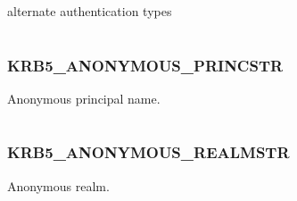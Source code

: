 \documentclass[letterpaper,10pt,english]{sphinxmanual}
\begin{document}
alternate authentication types

\begin{tabulary}{\linewidth}{|L|L|}
\hline

 & 
\\
\hline\end{tabulary}



\subsubsection{KRB5\_ANONYMOUS\_PRINCSTR}
\label{appdev/refs/macros/KRB5_ANONYMOUS_PRINCSTR:krb5-anonymous-princstr}\label{appdev/refs/macros/KRB5_ANONYMOUS_PRINCSTR:krb5-anonymous-princstr-data}\label{appdev/refs/macros/KRB5_ANONYMOUS_PRINCSTR::doc}

\begin{fulllineitems}
\label{appdev/refs/macros/KRB5_ANONYMOUS_PRINCSTR:KRB5_ANONYMOUS_PRINCSTR}
\end{fulllineitems}


Anonymous principal name.

\begin{tabulary}{\linewidth}{|L|L|}
\hline

 & 
\\
\hline\end{tabulary}



\subsubsection{KRB5\_ANONYMOUS\_REALMSTR}
\label{appdev/refs/macros/KRB5_ANONYMOUS_REALMSTR:krb5-anonymous-realmstr-data}\label{appdev/refs/macros/KRB5_ANONYMOUS_REALMSTR:krb5-anonymous-realmstr}\label{appdev/refs/macros/KRB5_ANONYMOUS_REALMSTR::doc}

\begin{fulllineitems}
\label{appdev/refs/macros/KRB5_ANONYMOUS_REALMSTR:KRB5_ANONYMOUS_REALMSTR}
\end{fulllineitems}


Anonymous realm.

\begin{tabulary}{\linewidth}{|L|L|}
\hline

 & 
\\
\hline\end{tabulary}
\end{document}
